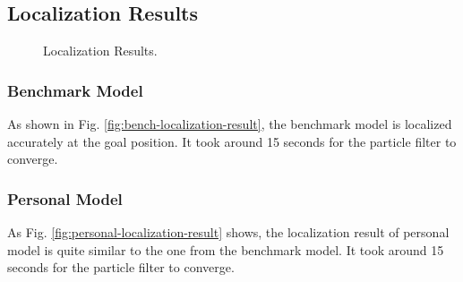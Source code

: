 \documentclass[10pt,journal,compsoc]{IEEEtran}
\begin{document}
\subsection{Localization Results}
\begin{figure}[thpb]
      \centering
      \hfill
      \caption{Localization Results.}
\end{figure}

\subsubsection{Benchmark Model}
As shown in Fig. \ref{fig:bench-localization-result}, the benchmark model is localized accurately at the goal position. It took around 15 seconds for the particle filter to converge.

\subsubsection{Personal Model}
As Fig. \ref{fig:personal-localization-result} shows, the localization result of personal model is quite similar to the one from the benchmark model. It took around 15 seconds for the particle filter to converge.
\end{document}
